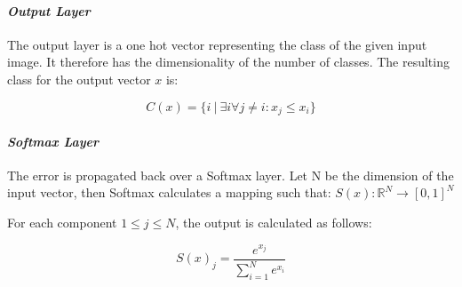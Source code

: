 \paraV
\paragraph{\textit{Output Layer}}
The output layer is a one hot vector representing the class of the given input image. It therefore has the dimensionality of the number of classes. The resulting class for the output vector $x$ is:

\begin{center}
\begin{minipage}{0.65\columnwidth}
\begin{equation}
C(x) = \{i\ |\ \exists i \forall j \neq i : x_j \leq x_i\}
\end{equation}
\end{minipage}
\end{center}

\paraV
\paragraph{\textit{Softmax Layer}}
The error is propagated back over a Softmax layer. Let N be the dimension of the input vector, then Softmax calculates a mapping such that:
$S(x): \mathbb{R}^N \rightarrow [0,1]^N$

For each component $1 \leq j \leq N$, the output is calculated as follows:

\begin{center}
\begin{minipage}{0.5\columnwidth}
\begin{equation}
S(x)_j = \frac{e^{x_j}}{\sum_{i=1}^Ne^{x_i}}
\end{equation}
\end{minipage}
\end{center}
